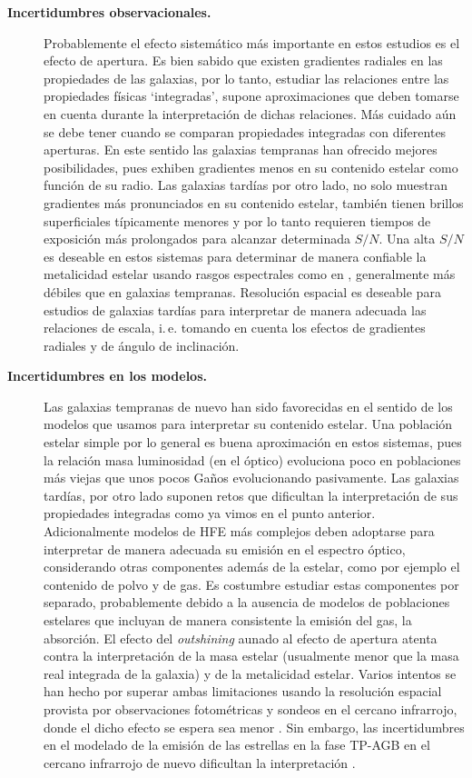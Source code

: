 \documentclass{article}
\begin{document}
\begin{description}
%
\item[\textbf{Incertidumbres observacionales.}] Probablemente el efecto sistemático más importante
en estos estudios es el efecto de apertura. Es bien sabido que existen gradientes radiales en las
propiedades de las galaxias, por lo tanto, estudiar las relaciones entre las propiedades físicas
`integradas', supone aproximaciones que deben tomarse en cuenta durante la interpretación de dichas
relaciones.
Más cuidado aún se debe tener cuando se comparan propiedades integradas con diferentes aperturas. En
este sentido las galaxias tempranas han ofrecido mejores posibilidades, pues exhiben gradientes
menos en su contenido estelar como función de su radio. Las galaxias tardías por otro lado, no solo
muestran gradientes más pronunciados en su contenido estelar, también tienen brillos superficiales
típicamente menores y por lo tanto requieren tiempos de exposición más prolongados para alcanzar
determinada $S/N$. Una alta $S/N$ es deseable en estos sistemas para determinar de manera confiable
la metalicidad estelar usando rasgos espectrales como en \citet{Gallazzi2005}, generalmente más
débiles que en galaxias tempranas. Resolución espacial es deseable para estudios de galaxias tardías
para interpretar de manera adecuada las relaciones de escala, i.\,e. tomando en cuenta los efectos
de gradientes radiales y de ángulo de inclinación.

\item[\textbf{Incertidumbres en los modelos.}] Las galaxias tempranas de nuevo han sido favorecidas
en el sentido de los modelos que usamos para interpretar su contenido estelar. Una población estelar
simple por lo general es buena aproximación en estos sistemas, pues la relación masa luminosidad (en
el óptico) evoluciona poco en poblaciones más viejas que unos pocos Gaños evolucionando pasivamente.
Las galaxias tardías, por otro lado suponen retos que dificultan la interpretación de sus
propiedades integradas como ya vimos en el punto anterior. Adicionalmente modelos de HFE más
complejos deben adoptarse para interpretar de manera adecuada su emisión en el espectro óptico,
considerando otras componentes además de la estelar, como por ejemplo el contenido de polvo y de
gas. Es costumbre estudiar estas componentes por separado, probablemente debido a la ausencia de
modelos de poblaciones estelares que incluyan de manera consistente la emisión del gas, la
absorción. El efecto del \emph{outshining} aunado al efecto de apertura atenta contra la
interpretación de la masa estelar (usualmente menor que la masa real integrada de la galaxia) y de
la metalicidad estelar. Varios intentos se han hecho por superar ambas limitaciones usando la
resolución espacial provista por observaciones fotométricas \citep{Sorba2015} y sondeos en el
cercano infrarrojo, donde el dicho efecto se espera sea menor \citep{Eminian2008}. Sin embargo, las
incertidumbres en el modelado de la emisión de las estrellas en la fase TP-AGB en el cercano
infrarrojo de nuevo dificultan la interpretación \citep{Zibetti2013}.
%
\end{description}
\end{document}
